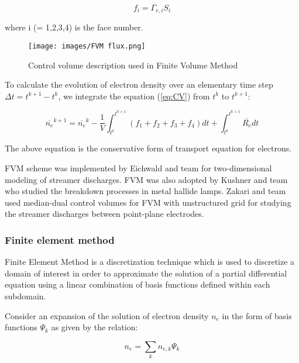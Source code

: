 \documentclass[paper=a4, fontsize=13pt]{scrartcl}
\begin{document}
\begin{equation}
f_i = \Gamma_{e,i} S_i
\end{equation}

where i (= 1,2,3,4) is the face number.

\begin{figure}
\centering
\texttt{[image: images/FVM flux.png]}
 \caption{Control volume description used in Finite Volume Method \cite{Moukalled2016TheDynamics} }
  \label{fig:Control Volume}
\end{figure}

To calculate the evolution of electron density over an elementary time step $\Delta t = t^{k+1}-t^{k}$, we integrate the equation (\ref{eq:CV}) from $t^k$ to $t^{k+1}$:

\begin{equation}
\overline{n_e}^{k+1} = \overline{n_e}^{k} - \frac{1}{V}\int^{t^{k+1}}_{t^k} (f_1 + f_2 + f_3 + f_4)dt + \int^{t^{k+1}}_{t^k} \overline{R_e}dt
\end{equation}

The above equation is the conservative form of transport equation for electrons.

FVM scheme was implemented by Eichwald and team \cite{Eichwald1998} \cite{Eichwald2006EffectDynamics} for two-dimensional modeling of streamer discharges. FVM was also adopted by Kushner and team \cite{Lay2003BreakdownLamps} who studied the breakdown processes in metal hallide lamps. Zakari and team \cite{Zakari2015AnDischarge} used median-dual control volumes for FVM with unstructured grid for studying the streamer discharges between point-plane electrodes.

\subsubsection{Finite element method}

Finite Element Method is a discretization technique which is used to discretize a domain of interest in order to approximate the solution of a partial differential equation using a linear combination of basis functions defined within each subdomain.

Consider an expansion of the solution of electron density $n_e$ in the form of basis functions $\Psi_k$ as given by the relation:

\begin{equation}
n_e = \sum_k n_{e,k} \Psi_k
\end{equation}
\end{document}
